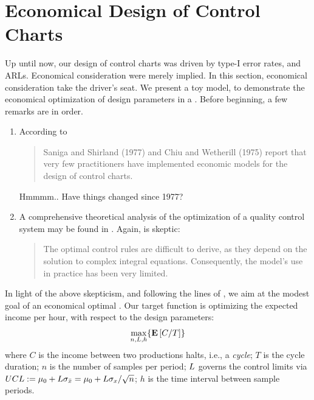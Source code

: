 \section{Economical Design of Control Charts}
\label{sec:economical_considerations}

Up until now, our design of control charts was driven by type-I error rates, and ARLs. Economical consideration were merely implied.
In this section, economical consideration take the driver's seat. 
We present a toy model, to demonstrate the economical optimization of design parameters in a \barxChart. 
Before beginning, a few remarks are in order. 

\begin{remark}
\noindent
\begin{enumerate}
\item According to \cite{montgomery_introduction_2007} 
\begin{quote}
Saniga and Shirland (1977) and Chiu and Wetherill (1975) report that very few practitioners have implemented economic models for the design of control charts.
\end{quote}
Hmmmm.. Have things changed since 1977?
\item A comprehensive theoretical analysis of the optimization of a quality control system may be found in \cite{girshick_bayes_1952}. Again, \cite{montgomery_introduction_2007} is skeptic:
\begin{quote}
The optimal control rules are difficult to derive, as they depend on the solution to
complex integral equations. Consequently, the model’s use in practice has been very
limited.
\end{quote}
\end{enumerate}
\end{remark}

In light of the above skepticism, and following the lines of \cite{duncan_economic_1956}, we aim at the modest goal of an economical optimal \barxChart. 
Our target function is optimizing the expected income per hour, with respect to the design parameters:
\begin{align}
\label{eq:optimal_design}
	\max_{n,L,h}\{ \mathbf{E}\left[ C/T \right] \}
\end{align}
where $C$ is the income between two productions halts, i.e., a \emph{cycle};
$T$ is the cycle duration;
$n$ is the number of samples per period;
$L$ governs the control limits via $UCL:= \mu_0+ L \sigma_{\bar{x}}= \mu_0+ L \sigma_x / \sqrt{n}$;
$h$ is the time interval between sample periods. 

